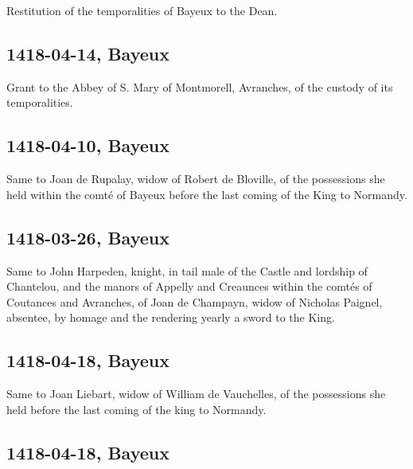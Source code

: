 \documentclass[a4paper,12pt,twoside]{book}
\begin{document}
                
                     Restitution of the temporalities of Bayeux to the Dean.
                  
                
                \subsection{1418-04-14, Bayeux}
                
                
                     Grant to the Abbey of S. Mary of Montmorell, Avranches, of the custody of its temporalities.
                  
                
                \subsection{1418-04-10, Bayeux}
                
                
                     Same to Joan de Rupalay, widow of Robert de Bloville, of the possessions she held within the comté of Bayeux before the last coming of the King to Normandy.
                  
                
                \subsection{1418-03-26, Bayeux}
                
                
                     Same to John Harpeden, knight, in tail male of the Castle and lordship of Chantelou, and the manors of Appelly and Creaunces within the comtés of Coutances and Avranches, of Joan de Champayn, widow of Nicholas Paignel, absentee, by homage and the rendering yearly a sword to the King.
                  
                
                \subsection{1418-04-18, Bayeux}
                
                
                     Same to Joan Liebart, widow of William de Vauchelles, of the possessions she held before the last coming of the king to Normandy.
                  
                
                \subsection{1418-04-18, Bayeux}
                
\end{document}
